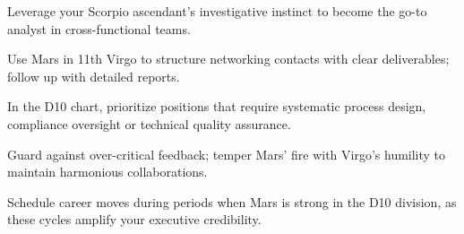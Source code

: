 \begin{diamondlist}
  \item {\fontsize{8.5}{12}\selectfont Leverage your Scorpio ascendant's investigative instinct to become the go-to analyst in cross-functional teams.}
  \item {\fontsize{8.5}{12}\selectfont Use Mars in 11th Virgo to structure networking contacts with clear deliverables; follow up with detailed reports.}
  \item {\fontsize{8.5}{12}\selectfont In the D10 chart, prioritize positions that require systematic process design, compliance oversight or technical quality assurance.}
  \item {\fontsize{8.5}{12}\selectfont Guard against over-critical feedback; temper Mars' fire with Virgo's humility to maintain harmonious collaborations.}
  \item {\fontsize{8.5}{12}\selectfont Schedule career moves during periods when Mars is strong in the D10 division, as these cycles amplify your executive credibility.}
\end{diamondlist}


\vspace{2mm}
\vspace{2mm}

